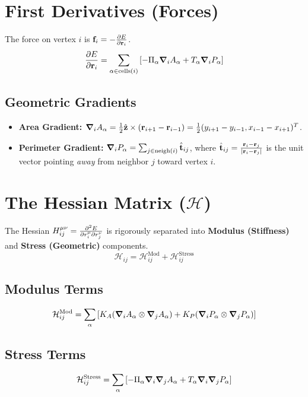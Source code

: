\documentclass[12pt]{article}
\begin{document}
\section{First Derivatives (Forces)}

The force on vertex $i$ is $\vb{f}_i = -\pdv{E}{\vb{r}_i}$.
\begin{equation}
    \pdv{E}{\vb{r}_i} = \sum_{\alpha \in \text{cells}(i)} \left[ -\Pi_\alpha \grad_i A_\alpha + T_\alpha \grad_i P_\alpha \right]
\end{equation}

\subsection{Geometric Gradients}
\begin{itemize}
    \item \textbf{Area Gradient:} $\grad_i A_\alpha = \frac{1}{2} \hat{\vb{z}} \times (\vb{r}_{i+1} - \vb{r}_{i-1}) = \frac{1}{2} (y_{i+1} - y_{i-1}, x_{i-1} - x_{i+1})^T$.
    \item \textbf{Perimeter Gradient:} $\grad_i P_\alpha = \sum_{j \in \text{neigh}(i)} \hat{\vb{t}}_{ij}$, where $\hat{\vb{t}}_{ij} = \frac{\vb{r}_i - \vb{r}_j}{|\vb{r}_i - \vb{r}_j|}$ is the unit vector pointing \textit{away} from neighbor $j$ toward vertex $i$.
\end{itemize}

\section{The Hessian Matrix ($\mathcal{H}$)}

The Hessian $H_{ij}^{\mu\nu} = \pdv{E}{r_i^\mu}{r_j^\nu}$ is rigorously separated into \textbf{Modulus (Stiffness)} and \textbf{Stress (Geometric)} components.
\begin{equation}
    \mathcal{H}_{ij} = \mathcal{H}_{ij}^{\text{Mod}} + \mathcal{H}_{ij}^{\text{Stress}}
\end{equation}

\subsection{Modulus Terms}
\begin{equation}
    \mathcal{H}_{ij}^{\text{Mod}} = \sum_\alpha \left[ K_A (\grad_i A_\alpha \otimes \grad_j A_\alpha) + K_P (\grad_i P_\alpha \otimes \grad_j P_\alpha) \right]
\end{equation}

\subsection{Stress Terms}
\begin{equation}
    \mathcal{H}_{ij}^{\text{Stress}} = \sum_\alpha \left[ -\Pi_\alpha \grad_i \grad_j A_\alpha + T_\alpha \grad_i \grad_j P_\alpha \right]
\end{equation}
\end{document}

